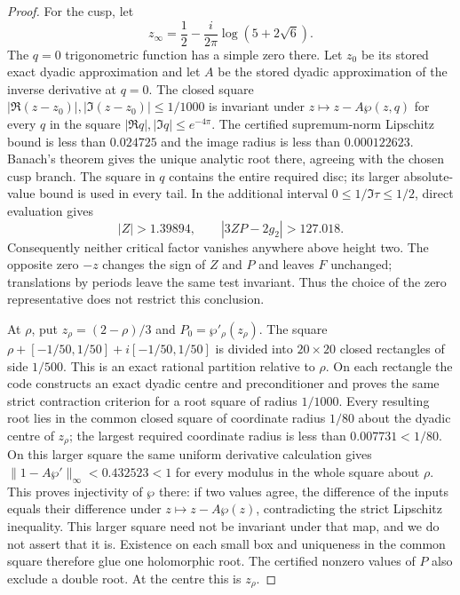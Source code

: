 \begin{proof}
For the cusp, let
\[
 z_\infty=\frac12-\frac{i}{2\pi}\log(5+2\sqrt6).
\]
The $q=0$ trigonometric function has a simple zero there. Let $z_0$
be its stored exact dyadic approximation and let $A$ be the stored
dyadic approximation of the inverse derivative at $q=0$. The
closed square $|\Re(z-z_0)|,|\Im(z-z_0)|\leq1/1000$ is invariant
under $z\mapsto z-A\wp(z,q)$ for every $q$ in the square
$|\Re q|,|\Im q|\leq e^{-4\pi}$. The certified supremum-norm
Lipschitz bound is less than $0.024725$ and the image radius is less
than $0.000122623$. Banach's theorem gives the unique analytic root
there, agreeing with the chosen cusp branch. The square in $q$
contains the entire required disc; its larger absolute-value bound
is used in every tail. In the additional interval
$0\leq1/\Im\tau\leq1/2$, direct evaluation gives
\[
 |Z|>1.39894,\qquad |3ZP-2g_2|>127.018.
\]
Consequently neither critical factor vanishes anywhere above height
two. The opposite zero $-z$ changes the sign of $Z$ and $P$ and
leaves $F$ unchanged; translations by periods leave the same test
invariant. Thus the choice of the zero representative does not
restrict this conclusion.

At $\rho$, put $z_\rho=(2-\rho)/3$ and $P_0=\wp'_\rho(z_\rho)$.
The square $\rho+[-1/50,1/50]+i[-1/50,1/50]$ is divided into
$20\times20$ closed rectangles of side $1/500$. This is an exact
rational partition relative to $\rho$. On each rectangle the code
constructs an exact dyadic centre and preconditioner and proves the
same strict contraction criterion for a root square of radius
$1/1000$. Every resulting root lies in the common closed square of
coordinate radius $1/80$ about the dyadic centre of $z_\rho$; the
largest required coordinate radius is less than $0.007731<1/80$.
On this larger square the same uniform derivative calculation
gives $\|1-A\wp'\|_\infty<0.432523<1$ for every modulus in the
whole square about $\rho$. This proves injectivity of $\wp$ there:
if two values agree, the difference of the inputs equals their
difference under $z\mapsto z-A\wp(z)$, contradicting the strict
Lipschitz inequality. This larger square need not be invariant
under that map, and we do not assert that it is. Existence on each
small box and uniqueness in the common square therefore glue one
holomorphic root. The certified nonzero values of $P$ also exclude
a double root. At the centre this is $z_\rho$.


\end{proof}
